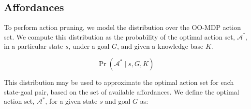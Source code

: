 \documentclass[conference]{IEEEtran}
\begin{document}



\subsection{Affordances}


To perform action pruning, we model the distribution over the OO-MDP
action set. We compute this distribution as the probability of the
optimal action set, $\mathcal{A}^*$, in a particular state $s$, under
a goal $G$, and given a knowledge base $K$.

\begin{equation}
\Pr(\mathcal{A}^* \mid s, G, K)
\label{eq:master}
\end{equation}

This distribution may be used to approximate the optimal action set for each 
state-goal pair, based on the set of available affordances. We define the optimal
action set, $\mathcal{A}^*$, for a given state $s$ and goal $G$ as:
\end{document}
